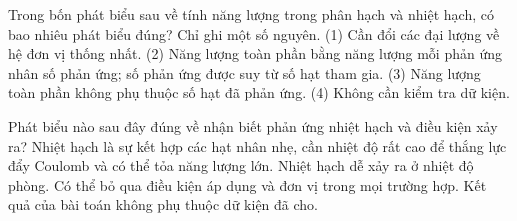\begin{ex}
Trong bốn phát biểu sau về tính năng lượng trong phân hạch và nhiệt hạch, có bao nhiêu phát biểu đúng? Chỉ ghi một số nguyên. (1) Cần đổi các đại lượng về hệ đơn vị thống nhất. (2) Năng lượng toàn phần bằng năng lượng mỗi phản ứng nhân số phản ứng; số phản ứng được suy từ số hạt tham gia. (3) Năng lượng toàn phần không phụ thuộc số hạt đã phản ứng. (4) Không cần kiểm tra dữ kiện.
\end{ex}

\begin{ex}
Phát biểu nào sau đây đúng về nhận biết phản ứng nhiệt hạch và điều kiện xảy ra?
\choice
{\True Nhiệt hạch là sự kết hợp các hạt nhân nhẹ, cần nhiệt độ rất cao để thắng lực đẩy Coulomb và có thể tỏa năng lượng lớn.}
{Nhiệt hạch dễ xảy ra ở nhiệt độ phòng.}
{Có thể bỏ qua điều kiện áp dụng và đơn vị trong mọi trường hợp.}
{Kết quả của bài toán không phụ thuộc dữ kiện đã cho.}
\end{ex}

